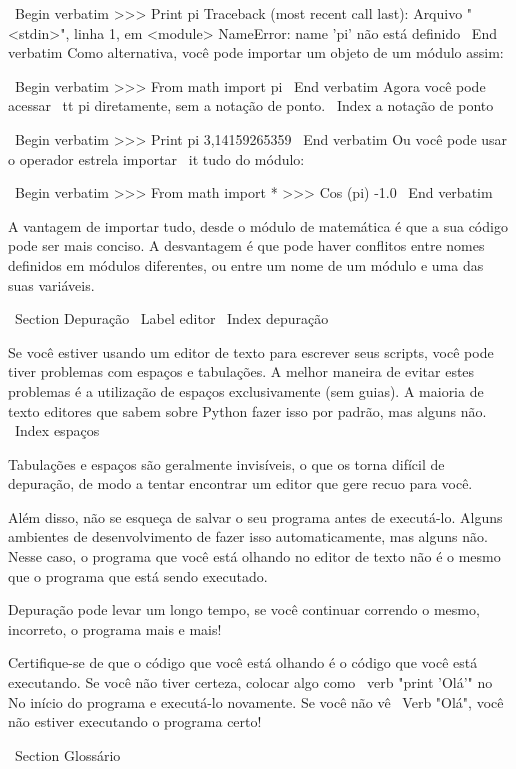 \documentclass[10pt]{book}
\begin{document}
{\ Begin {verbatim}
>>> Print pi
Traceback (most recent call last):
  Arquivo "<stdin>", linha 1, em <module>
NameError: name 'pi' não está definido
\ End {verbatim}
%
Como alternativa, você pode importar um objeto de um módulo assim:

\ Begin {verbatim}
>>> From math import pi
\ End {verbatim}
%
Agora você pode acessar {\ tt pi} diretamente, sem a notação de ponto.
\ Index {} a notação de ponto

\ Begin {verbatim}
>>> Print pi
3,14159265359
\ End {verbatim}
%
Ou você pode usar o operador estrela importar {\ it tudo} do
módulo:

\ Begin {verbatim}
>>> From math import *
>>> Cos (pi)
-1.0
\ End {verbatim}

A vantagem de importar tudo, desde o módulo de matemática é que a sua
código pode ser mais conciso. A desvantagem é que pode haver
conflitos entre nomes definidos em módulos diferentes, ou entre
um nome de um módulo e uma das suas variáveis.


\ Section {} Depuração
\ Label {editor}
\ Index {depuração}

Se você estiver usando um editor de texto para escrever seus scripts, você pode
tiver problemas com espaços e tabulações. A melhor maneira de evitar
estes problemas é a utilização de espaços exclusivamente (sem guias). A maioria de texto
editores que sabem sobre Python fazer isso por padrão, mas alguns
não.
\ Index {espaços}

Tabulações e espaços são geralmente invisíveis, o que os torna
difícil de depuração, de modo a tentar encontrar um editor que gere recuo
para você.

Além disso, não se esqueça de salvar o seu programa antes de executá-lo. Alguns
ambientes de desenvolvimento de fazer isso automaticamente, mas alguns não.
Nesse caso, o programa que você está olhando no editor de texto
não é o mesmo que o programa que está sendo executado.

Depuração pode levar um longo tempo, se você continuar correndo o mesmo,
incorreto, o programa mais e mais!

Certifique-se de que o código que você está olhando é o código que você está executando.
Se você não tiver certeza, colocar algo como \ verb "print 'Olá'" no
No início do programa e executá-lo novamente. Se você não vê
\ Verb "Olá", você não estiver executando o programa certo!




\ Section {} Glossário

}
\end{document}
